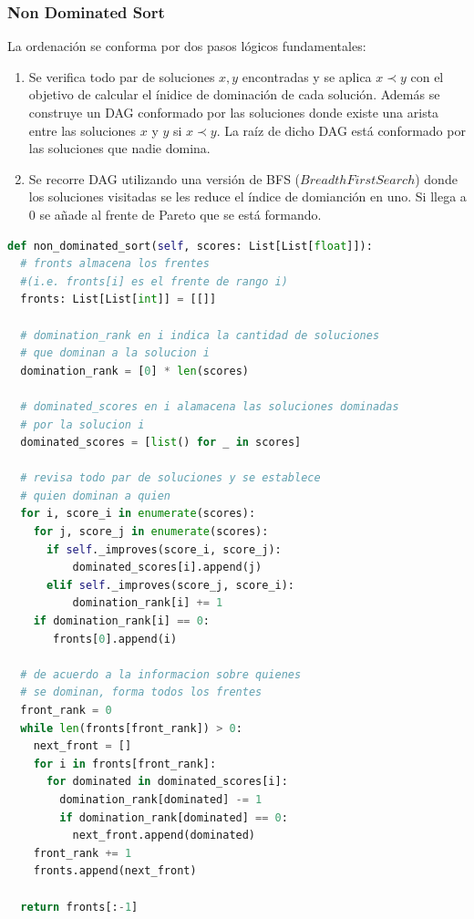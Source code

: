 \subsubsection{Non Dominated Sort}
La ordenaci\'on se conforma por dos pasos l\'ogicos fundamentales:
\begin{enumerate}
    \item Se verifica todo par de soluciones $x, y$ encontradas y se aplica $x \prec y$ con el objetivo de calcular el \'inidice de dominaci\'on de cada soluci\'on. Adem\'as se construye un DAG conformado por las soluciones donde existe una arista entre las soluciones $x$ y $y$ si $x \prec y$. La ra\'iz de dicho DAG est\'a conformado por las soluciones que nadie domina.
    \item Se recorre DAG utilizando una versi\'on de BFS ($Breadth First Search$) donde los soluciones visitadas se les reduce el \'indice de domianci\'on en uno. Si llega a 0 se a\~nade al frente de Pareto que se est\'a formando.
\end{enumerate}

\begin{lstlisting}[language=Python]
def non_dominated_sort(self, scores: List[List[float]]):
  # fronts almacena los frentes 
  #(i.e. fronts[i] es el frente de rango i)
  fronts: List[List[int]] = [[]]

  # domination_rank en i indica la cantidad de soluciones
  # que dominan a la solucion i
  domination_rank = [0] * len(scores)

  # dominated_scores en i alamacena las soluciones dominadas
  # por la solucion i
  dominated_scores = [list() for _ in scores]

  # revisa todo par de soluciones y se establece
  # quien dominan a quien
  for i, score_i in enumerate(scores):
    for j, score_j in enumerate(scores):
      if self._improves(score_i, score_j):
          dominated_scores[i].append(j)
      elif self._improves(score_j, score_i):
          domination_rank[i] += 1
    if domination_rank[i] == 0:
       fronts[0].append(i)

  # de acuerdo a la informacion sobre quienes
  # se dominan, forma todos los frentes
  front_rank = 0
  while len(fronts[front_rank]) > 0:
    next_front = []
    for i in fronts[front_rank]:
      for dominated in dominated_scores[i]:
        domination_rank[dominated] -= 1
        if domination_rank[dominated] == 0:
          next_front.append(dominated)
    front_rank += 1
    fronts.append(next_front)

  return fronts[:-1]
\end{lstlisting}

